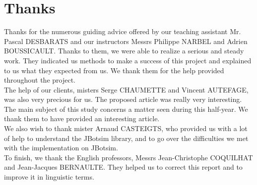 \chapter*{Thanks}

Thanks for the numerous guiding advice offered by our teaching assistant Mr. Pascal DESBARATS and our instructors Messrs Philippe NARBEL and Adrien BOUSSICAULT. Thanks to them, we were able to realize a serious and steady work. They indicated us methods to make a success of this project and explained to us what they expected from us. We thank them for the help provided throughout the project.\\

The help of our clients, misters Serge CHAUMETTE and Vincent AUTEFAGE, was also very precious for us. The proposed article was really very interesting. The main subject of this study concerns a matter seen during this half-year. We thank them to have provided an interesting article.\\

We also wish to thank mister Arnaud CASTEIGTS, who provided us with a lot of help to understand the JBotsim library, and to go over the difficulties we met with the implementation on JBotsim.\\

To finish, we thank the English professors, Messrs Jean-Christophe COQUILHAT and Jean-Jacques BERNAULTE. They helped us to correct this report and to improve it in linguistic terms.